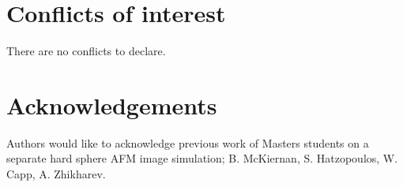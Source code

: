 



\section*{Conflicts of interest}
There are no conflicts to declare.

\section*{Acknowledgements}
Authors would like to acknowledge previous work of Masters students on a separate hard sphere AFM image simulation; B. McKiernan, S. Hatzopoulos, W. Capp, A. Zhikharev.


